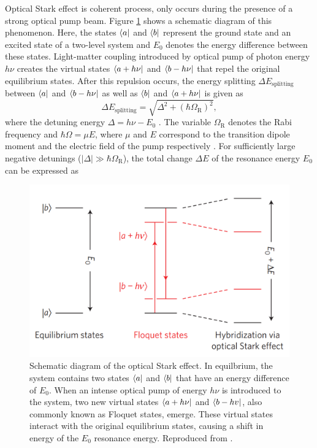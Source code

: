 Optical Stark effect is coherent process, only occurs during the presence of a strong optical pump beam. Figure \ref{fig:optical_stark_effect_schematic_sie} shows a schematic diagram of this phenomenon. Here, the states $\bra{a}$ and $\bra{b}$ represent the ground state and an excited state of a two-level system and $E_0$ denotes the energy difference between these states. Light-matter coupling introduced by optical pump of photon energy $h \nu$ creates the virtual states $\bra{a + h \nu}$ and $\bra{b - h \nu}$ that repel the original equilibrium states. After this repulsion occurs, the energy splitting $\Delta E_\text{splitting}$ between $\bra{a}$  and $\bra{b - h \nu}$ as well as $\bra{b}$ and $\bra{a + h \nu}$ is given as
\begin{equation}
	\Delta E_\text{splitting} = \sqrt{\Delta^2 + (\hbar\Omega_\text{R})^2 },
\end{equation}
where the detuning energy $\Delta = h \nu - E_0$ \cite{mysyrowicz1986dressed}. The variable $\Omega_\text{R}$ denotes the Rabi frequency and $\hbar \Omega = \mu E$, where $\mu$ and $E$ correspond to the transition dipole moment and the electric field of the pump respectively
\cite{mysyrowicz1986dressed}. For sufficiently large negative detunings ($|\Delta| \gg \hbar \Omega_\text{R}$), the total change $\Delta E$ of the resonance energy $E_0$ can be expressed as
\begin{figure}[ht]
	\centering
	\includegraphics[scale=0.3]{images/chapter_prior_works/optical_stark_effect_sie_2014}
	\caption{Schematic diagram of the optical Stark effect. In equilbrium, the system contains two states $\bra{a}$ and $\bra{b}$ that have an energy difference of $E_0$. When an intense optical pump of energy $h \nu$ is introduced to the system, two new virtual states $\bra{a + h \nu }$ and $\bra{b - hv}$, also commonly known as Floquet states, emerge. These virtual states interact with the original equilibrium states, causing a shift in energy of the $E_0$ resonance energy. Reproduced from \cite{sie2015valley}.}
	\label{fig:optical_stark_effect_schematic_sie}
\end{figure}

